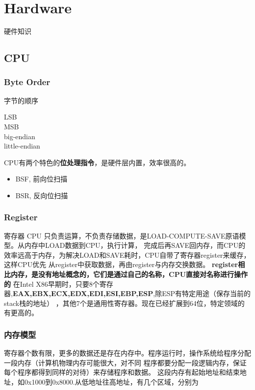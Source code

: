 \clearpage
\part{Hardware}

硬件知识

\chapter{CPU}

\section{Byte Order}

字节的顺序

\begin{description}
    \item [LSB] 
    \item [MSB] 
    \item [big-endian] 
    \item [little-endian] 
\end{description}

CPU有两个特色的\textbf{位处理指令}，是硬件层内置，效率很高的。
\begin{itemize}
    \item {BSF, 前向位扫描}
    \item {BSR, 反向位扫描}
\end{itemize}

\section{Register}
寄存器
CPU 只负责运算，不负责存储数据，是LOAD-COMPUTE-SAVE原语模型。从内存中LOAD数据到CPU，执行计算，
完成后再SAVE回内存，而CPU的效率远高于内存，为解决LOAD和SAVE耗时，CPU自带了寄存器register来缓存，这样CPU优先
从register中获取数据，再由register与内存交换数据。
\newline
\textbf{register相比内存，是没有地址概念的，它们是通过自己的名称，CPU直接对名称进行操作的}
\newline
在Intel X86早期时，只要8个寄存器,\textbf{EAX,EBX,ECX,EDX,EDI,ESI,EBP,ESP},除ESP有特定用途（保存当前的stack栈的地址）
，其他7个是通用性寄存器。现在已经扩展到64位，特定领域的有更高的。 

\section{内存模型}
寄存器个数有限，更多的数据还是存在内存中。程序运行时，操作系统给程序分配一段内存（计算机物理内存可能很大，对不同
程序都要分配一段逻辑内存，保证每个程序都得到同样的对待）来存储程序和数据。
\newline
这段内存有起始地址和结束地址，如0x1000到0x8000.从低地址往高地址，有几个区域，分别为
